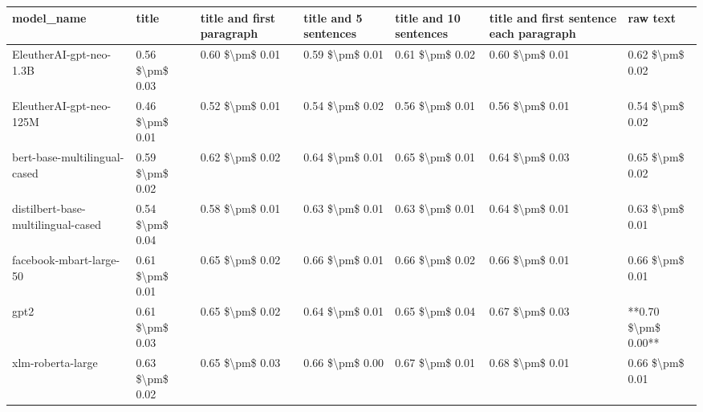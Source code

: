 \begin{tabular}{lllllll}
\toprule
                        model\_name &           title & title and first paragraph & title and 5 sentences & title and 10 sentences & title and first sentence each paragraph &            raw text \\
\midrule
           EleutherAI-gpt-neo-1.3B & 0.56 \$\textbackslash pm\$ 0.03 &           0.60 \$\textbackslash pm\$ 0.01 &       0.59 \$\textbackslash pm\$ 0.01 &        0.61 \$\textbackslash pm\$ 0.02 &                         0.60 \$\textbackslash pm\$ 0.01 &     0.62 \$\textbackslash pm\$ 0.02 \\
           EleutherAI-gpt-neo-125M & 0.46 \$\textbackslash pm\$ 0.01 &           0.52 \$\textbackslash pm\$ 0.01 &       0.54 \$\textbackslash pm\$ 0.02 &        0.56 \$\textbackslash pm\$ 0.01 &                         0.56 \$\textbackslash pm\$ 0.01 &     0.54 \$\textbackslash pm\$ 0.02 \\
      bert-base-multilingual-cased & 0.59 \$\textbackslash pm\$ 0.02 &           0.62 \$\textbackslash pm\$ 0.02 &       0.64 \$\textbackslash pm\$ 0.01 &        0.65 \$\textbackslash pm\$ 0.01 &                         0.64 \$\textbackslash pm\$ 0.03 &     0.65 \$\textbackslash pm\$ 0.02 \\
distilbert-base-multilingual-cased & 0.54 \$\textbackslash pm\$ 0.04 &           0.58 \$\textbackslash pm\$ 0.01 &       0.63 \$\textbackslash pm\$ 0.01 &        0.63 \$\textbackslash pm\$ 0.01 &                         0.64 \$\textbackslash pm\$ 0.01 &     0.63 \$\textbackslash pm\$ 0.01 \\
           facebook-mbart-large-50 & 0.61 \$\textbackslash pm\$ 0.01 &           0.65 \$\textbackslash pm\$ 0.02 &       0.66 \$\textbackslash pm\$ 0.01 &        0.66 \$\textbackslash pm\$ 0.02 &                         0.66 \$\textbackslash pm\$ 0.01 &     0.66 \$\textbackslash pm\$ 0.01 \\
                              gpt2 & 0.61 \$\textbackslash pm\$ 0.03 &           0.65 \$\textbackslash pm\$ 0.02 &       0.64 \$\textbackslash pm\$ 0.01 &        0.65 \$\textbackslash pm\$ 0.04 &                         0.67 \$\textbackslash pm\$ 0.03 & **0.70 \$\textbackslash pm\$ 0.00** \\
                 xlm-roberta-large & 0.63 \$\textbackslash pm\$ 0.02 &           0.65 \$\textbackslash pm\$ 0.03 &       0.66 \$\textbackslash pm\$ 0.00 &        0.67 \$\textbackslash pm\$ 0.01 &                         0.68 \$\textbackslash pm\$ 0.01 &     0.66 \$\textbackslash pm\$ 0.01 \\
\bottomrule
\end{tabular}
